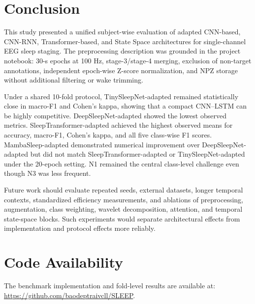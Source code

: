 \documentclass[conference]{IEEEtran}
\begin{document}
\section{Conclusion}

This study presented a unified subject-wise evaluation of adapted CNN-based, CNN-RNN, Transformer-based, and State Space architectures for single-channel EEG sleep staging. The preprocessing description was grounded in the project notebook: 30-s epochs at 100 Hz, stage-3/stage-4 merging, exclusion of non-target annotations, independent epoch-wise Z-score normalization, and NPZ storage without additional filtering or wake trimming.

Under a shared 10-fold protocol, TinySleepNet-adapted remained statistically close in macro-F1 and Cohen's kappa, showing that a compact CNN--LSTM can be highly competitive. DeepSleepNet-adapted showed the lowest observed metrics. SleepTransformer-adapted achieved the highest observed means for accuracy, macro-F1, Cohen's kappa, and all five class-wise F1 scores. MambaSleep-adapted demonstrated numerical improvement over DeepSleepNet-adapted but did not match SleepTransformer-adapted or TinySleepNet-adapted under the 20-epoch setting. N1 remained the central class-level challenge even though N3 was less frequent.

Future work should evaluate repeated seeds, external datasets, longer temporal contexts, standardized efficiency measurements, and ablations of preprocessing, augmentation, class weighting, wavelet decomposition, attention, and temporal state-space blocks. Such experiments would separate architectural effects from implementation and protocol effects more reliably.

\section{Code Availability}

The benchmark implementation and fold-level results are available at:
\url{https://github.com/baodeptraivcll/SLEEP}.




\end{document}
